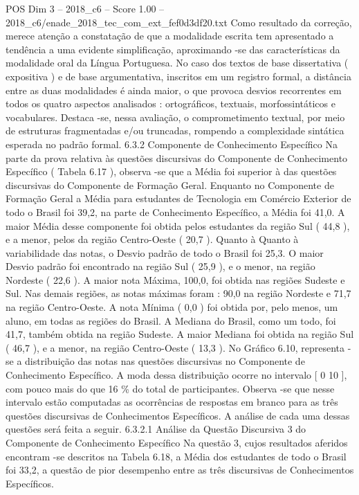 \begin{textsample}{POS Dim 3 – 2018\_c6 – Score 1.00 – 2018\_c6/enade\_2018\_tec\_com\_ext\_fef0d3df20.txt}
Como resultado da correção, merece atenção a constatação de que a modalidade escrita tem apresentado a tendência a uma evidente simplificação, aproximando -se das características da modalidade oral da Língua Portuguesa.
No caso dos textos de base dissertativa ( expositiva ) e de base argumentativa, inscritos em um registro formal, a distância entre as duas modalidades é ainda maior, o que provoca desvios recorrentes em todos os quatro aspectos analisados : ortográficos, textuais, morfossintáticos e vocabulares.
Destaca -se, nessa avaliação, o comprometimento textual, por meio de estruturas fragmentadas e/ou truncadas, rompendo a complexidade sintática esperada no padrão formal. 6.3.2 Componente de Conhecimento Específico Na parte da prova relativa às questões discursivas do Componente de Conhecimento Específico ( Tabela 6.17 ), observa -se que a Média foi superior à das questões discursivas do Componente de Formação Geral.
Enquanto no Componente de Formação Geral a Média para estudantes de Tecnologia em Comércio Exterior de todo o Brasil foi 39,2, na parte de Conhecimento Específico, a Média foi 41,0.
A maior Média desse componente foi obtida pelos estudantes da região Sul ( 44,8 ), e a menor, pelos da região Centro-Oeste ( 20,7 ).
Quanto à Quanto à variabilidade das notas, o Desvio padrão de todo o Brasil foi 25,3.
O maior Desvio padrão foi encontrado na região Sul ( 25,9 ), e o menor, na região Nordeste ( 22,6 ).
A maior nota Máxima, 100,0, foi obtida nas regiões Sudeste e Sul.
Nas demais regiões, as notas máximas foram : 90,0 na região Nordeste e 71,7 na região Centro-Oeste.
A nota Mínima ( 0,0 ) foi obtida por, pelo menos, um aluno, em todas as regiões do Brasil.
A Mediana do Brasil, como um todo, foi 41,7, também obtida na região Sudeste.
A maior Mediana foi obtida na região Sul ( 46,7 ), e a menor, na região Centro-Oeste ( 13,3 ).
No Gráfico 6.10, representa -se a distribuição das notas nas questões discursivas no Componente de Conhecimento Específico.
A moda dessa distribuição ocorre no intervalo [ 0 10 ], com pouco mais do que 16 \% do total de participantes.
Observa -se que nesse intervalo estão computadas as ocorrências de respostas em branco para as três questões discursivas de Conhecimentos Específicos.
A análise de cada uma dessas questões será feita a seguir. 6.3.2.1 Análise da Questão Discursiva 3 do Componente de Conhecimento Específico Na questão 3, cujos resultados aferidos encontram -se descritos na Tabela 6.18, a Média dos estudantes de todo o Brasil foi 33,2, a questão de pior desempenho entre as três discursivas de Conhecimentos Específicos.

\end{textsample}
